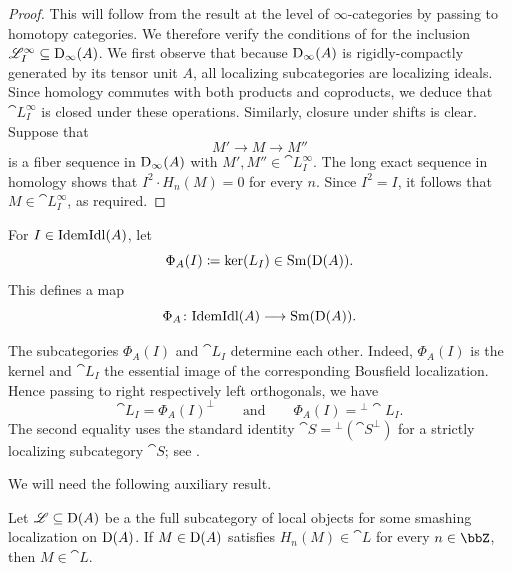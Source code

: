 \documentclass{amsart}
\begin{document}
\begin{proof}
   This will follow from the result at the level of $\infty$-categories by passing to homotopy categories. We therefore verify the conditions of  for the inclusion $\mathscr{L}_I^{\infty} \subseteq \operatorname{D}_{\infty}(A)$. We first observe that because $\operatorname{D}_{\infty}(A)$ is rigidly-compactly generated by its tensor unit $A$, all localizing subcategories are localizing ideals.  Since homology commutes with both products and coproducts, we deduce that $\cat L^{\infty}_I$ is closed under these operations. Similarly, closure under shifts is clear. Suppose that 
            \[
            M' \to M \to M''
            \]
            is a fiber sequence in $\operatorname{D}_{\infty}(A)$ with $M',M'' \in \cat L^{\infty}_I$. The long exact sequence in homology shows that $I^2 \cdot H_n(M) = 0$ for every $n$. Since $I^2 = I$, it follows that $M \in \cat L^{\infty}_I$, as required. 
\end{proof}
\begin{Def}
    For $I\in\mathrm{IdemIdl}(A)$, let
    \[
        \Phi_A(I)\coloneqq\ker(L_I) \in\operatorname{Sm}(\operatorname{D}(A)).
    \]
    This defines a map
    \[
        \Phi_A\colon\mathrm{IdemIdl}(A)\longrightarrow\operatorname{Sm}(\operatorname{D}(A)).
    \]
\end{Def}
\begin{Rem}\label{rem:strictly-localizing}
    The subcategories $\Phi_A(I)$ and $\cat L_I$ determine each other. Indeed, $\Phi_A(I)$ is the kernel and $\cat L_I$ the essential image of the
    corresponding Bousfield localization. Hence passing to right respectively left orthogonals, we have
    \[
        \cat L_I = \Phi_A(I)^\perp \qquad \text{and} \qquad \Phi_A(I) = {}^{\perp} \cat L_I.
    \]
    The second equality uses the standard identity $\cat S={}^{\perp}(\cat S^\perp)$ for a strictly localizing subcategory $\cat S$; see \cite[Proposition~4.9.1]{Krause10}.
\end{Rem}
We will need the following auxiliary result. 
\begin{Lem}\label{lem:heart-subcategory}
       Let $\mathscr{L} \subseteq \operatorname{D}(A)$ be a the full subcategory of local objects for some smashing localization on $\operatorname{D}(A)$. %
       If $M \in \operatorname{D}(A)$ satisfies $H_n(M) \in \cat L$ for every $n\in\bbZ$, then $M \in \cat L$.
\end{Lem}
\end{document}
